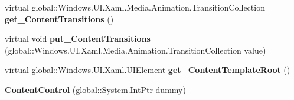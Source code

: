 \begin{DoxyCompactItemize}
virtual global\+::\+Windows.\+U\+I.\+Xaml.\+Media.\+Animation.\+Transition\+Collection {\bfseries get\+\_\+\+Content\+Transitions} ()
\item 
\mbox{\label{class_windows_1_1_u_i_1_1_xaml_1_1_controls_1_1_content_control_aa5fc9bac28b70e7fe86efcb229e8c57d}} 
virtual void {\bfseries put\+\_\+\+Content\+Transitions} (global\+::\+Windows.\+U\+I.\+Xaml.\+Media.\+Animation.\+Transition\+Collection value)
\item 
\mbox{\label{class_windows_1_1_u_i_1_1_xaml_1_1_controls_1_1_content_control_a1b8d96eef56757cec1eb123b64b62fe4}} 
virtual global\+::\+Windows.\+U\+I.\+Xaml.\+U\+I\+Element {\bfseries get\+\_\+\+Content\+Template\+Root} ()
\item 
\mbox{\label{class_windows_1_1_u_i_1_1_xaml_1_1_controls_1_1_content_control_a54ac07e93dd29c05ab129eb11a433a57}} 
{\bfseries Content\+Control} (global\+::\+System.\+Int\+Ptr dummy)
\end{DoxyCompactItemize}
